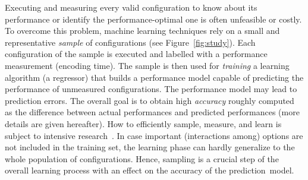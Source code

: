 Executing and measuring every valid configuration to know about its performance or identify the performance-optimal one is often unfeasible or costly. To overcome this problem, machine learning techniques rely on a small and representative \emph{sample} of configurations (see Figure~\ref{fig:study}).
Each configuration of the sample is executed and labelled with a performance measurement (\eg encoding time). The sample is then used for \emph{training} a learning algorithm (\ie a regressor) that builds a performance model capable of predicting the performance of unmeasured configurations. 
 The performance model may lead to prediction errors. The overall goal is to obtain high \emph{accuracy} roughly computed as the difference between actual performances and predicted performances (more details are given hereafter). 
 How to efficiently sample, measure, and learn is subject to intensive research~\cite{julianasurvey}. In case important (interactions among) options are not included in the training set, the learning phase can hardly generalize to the whole population of configurations. Hence, sampling is a crucial step of the overall learning process with an effect on the accuracy of the \mbox{prediction model.}


 
 
 
 
 
 

 


 


